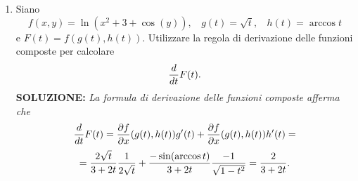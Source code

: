 \documentclass[12pt,a4paper]{report}\pagenumbering{roman}
\begin{document}
\begin{enumerate}
\item Siano
$$f(x,y)=\ln(x^2+3+\cos(y)),\ \ \ \ g(t)=\sqrt{t},\ \ \ \ h(t)=\arccos t$$
e $F(t)=f(g(t),h(t))$. Utilizzare la regola di derivazione delle funzioni
composte per calcolare 
$${d\over dt}F(t).$$
{\bf SOLUZIONE:} {\it La formula di derivazione delle funzioni composte afferma che
$${d\over dt}F(t)={\partial f\over\partial x}(g(t),h(t))g'(t)+
{\partial f\over\partial x}(g(t),h(t))h'(t)=$$
$$={2\sqrt{t}\over 3+2t}{1\over 2\sqrt{t}}+{-\sin(\arccos t)\over 3+2t}{-1\over \sqrt{1-t^2}}={2\over3+2t}.$$}
\end{enumerate}
\end{document}
